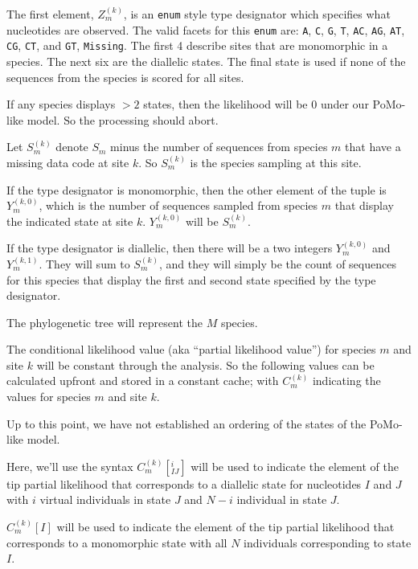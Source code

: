 \documentclass{llncs}
\newcommand{\virtPopSize}{\ensuremath{N}}
\newcommand{\pomo}{PoMo\xspace}
\begin{document}
The first element, $Z_m^{(k)}$, is an {\tt enum} style type designator which specifies what nucleotides are observed.
The valid facets for this {\tt enum} are: \texttt{A}, \texttt{C}, \texttt{G}, \texttt{T}, \texttt{AC}, \texttt{AG}, \texttt{AT}, \texttt{CG}, \texttt{CT}, and \texttt{GT}, \texttt{Missing}.
The first 4 describe sites that are monomorphic in a species.
The next six are the diallelic states.
The final state is used if none of the sequences from the species is scored for all sites.

If any species displays $>2$ states, then the likelihood will be 0 under our \pomo-like model.
So the processing should abort.

Let $S_m^{(k)}$ denote $S_m$ minus the number of sequences from species $m$ that have a missing data code at site $k$. 
So $S_m^{(k)}$ is the species sampling at this site.

If the type designator is monomorphic, then the other element of the tuple is $Y_m^{(k,0)}$, which is the number of sequences sampled from species $m$ that display the indicated state at site $k$.
$Y_m^{(k,0)}$ will be $S_m^{(k)}$.


If the type designator is diallelic, then there will be a two integers $Y_m^{(k,0)}$ and $Y_m^{(k,1)}$.
They will sum to $S_m^{(k)}$, and they will simply be the count of sequences for this species that display the first and second state specified by the type designator.

The phylogenetic tree will represent the $M$ species.

The conditional likelihood value (aka ``partial likelihood value'') for species $m$ and site $k$ will be constant through the analysis.
So the following values can be calculated upfront and stored in a constant cache;
with $C_m^{(k)}$ indicating the values for species $m$ and site $k$.

Up to this point, we have not established an ordering of the states of the \pomo-like model.

Here, we'll use the syntax $C_m^{(k)}[^{i}_{IJ}]$ will be used to indicate the element of 
    the tip partial likelihood that corresponds to a diallelic state for nucleotides $I$ and $J$
    with $i$ virtual individuals in state $J$ and $N-i$ individual in state $J$.

$C_m^{(k)}[I]$ will be used to indicate the element of 
    the tip partial likelihood that corresponds to a monomorphic state with all $\virtPopSize$
    individuals corresponding to state $I$.
\end{document}
